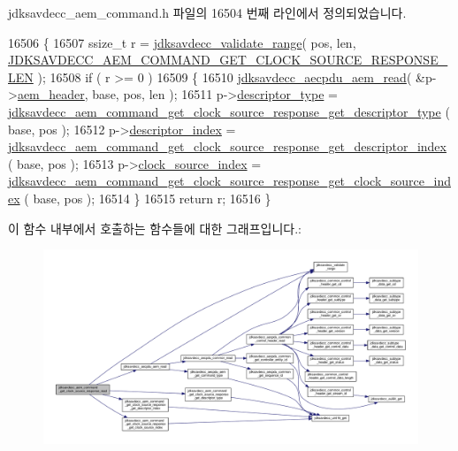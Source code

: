 jdksavdecc\+\_\+aem\+\_\+command.\+h 파일의 16504 번째 라인에서 정의되었습니다.


\begin{DoxyCode}
16506 \{
16507     ssize\_t r = \hyperlink{group__util_ga9c02bdfe76c69163647c3196db7a73a1}{jdksavdecc\_validate\_range}( pos, len, 
      \hyperlink{group__command__get__clock__source__response_gab6cf3d1066d1ef1a9402ece809e38de4}{JDKSAVDECC\_AEM\_COMMAND\_GET\_CLOCK\_SOURCE\_RESPONSE\_LEN} );
16508     \textcolor{keywordflow}{if} ( r >= 0 )
16509     \{
16510         \hyperlink{group__aecpdu__aem_gae2421015dcdce745b4f03832e12b4fb6}{jdksavdecc\_aecpdu\_aem\_read}( &p->\hyperlink{structjdksavdecc__aem__command__get__clock__source__response_ae1e77ccb75ff5021ad923221eab38294}{aem\_header}, base, pos, len );
16511         p->\hyperlink{structjdksavdecc__aem__command__get__clock__source__response_ab7c32b6c7131c13d4ea3b7ee2f09b78d}{descriptor\_type} = 
      \hyperlink{group__command__get__clock__source__response_ga0e8da8583b547be389a3fd8205f78f26}{jdksavdecc\_aem\_command\_get\_clock\_source\_response\_get\_descriptor\_type}
      ( base, pos );
16512         p->\hyperlink{structjdksavdecc__aem__command__get__clock__source__response_a042bbc76d835b82d27c1932431ee38d4}{descriptor\_index} = 
      \hyperlink{group__command__get__clock__source__response_gad8b3114a21e48deca8292d646417d4ce}{jdksavdecc\_aem\_command\_get\_clock\_source\_response\_get\_descriptor\_index}
      ( base, pos );
16513         p->\hyperlink{structjdksavdecc__aem__command__get__clock__source__response_ae6d3717453951addecc331540f572e30}{clock\_source\_index} = 
      \hyperlink{group__command__get__clock__source__response_gaed5029568cbd203a27a906e689311b16}{jdksavdecc\_aem\_command\_get\_clock\_source\_response\_get\_clock\_source\_index}
      ( base, pos );
16514     \}
16515     \textcolor{keywordflow}{return} r;
16516 \}
\end{DoxyCode}


이 함수 내부에서 호출하는 함수들에 대한 그래프입니다.\+:
\nopagebreak
\begin{figure}[H]
\begin{center}
\leavevmode
\includegraphics[width=350pt]{group__command__get__clock__source__response_gad17a1b97558b2aea05688490ef206904_cgraph}
\end{center}
\end{figure}




